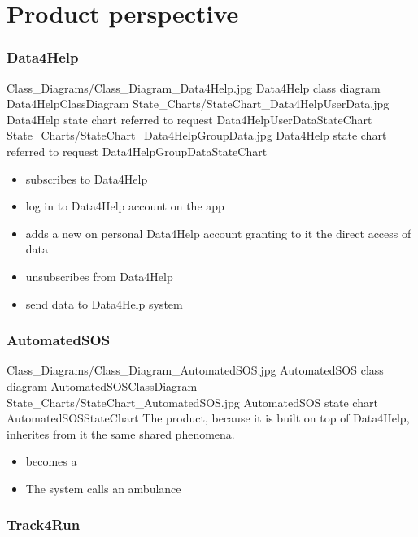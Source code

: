 \documentclass[../../rasd.tex]{subfiles}
\begin{document}
	
	\section{Product perspective}

		\subsubsection{Data4Help}

			\image {13cm} {Class_Diagrams/Class_Diagram_Data4Help.jpg} {Data4Help class diagram} {Data4HelpClassDiagram}
			\image {13cm} {State_Charts/StateChart_Data4HelpUserData.jpg} {Data4Help state chart referred to  request} {Data4HelpUserDataStateChart}
			\image {13cm} {State_Charts/StateChart_Data4HelpGroupData.jpg} {Data4Help state chart referred to  request} {Data4HelpGroupDataStateChart}

			\begin{itemize}
				\item {} subscribes to Data4Help
				\item {} log in to Data4Help account on the app
				\item {} adds a new  on personal Data4Help account granting to it the direct access of data
				\item {} unsubscribes from Data4Help
				\item {} send data to Data4Help system
			\end{itemize}

		\subsubsection{AutomatedSOS}

			\image {13cm} {Class_Diagrams/Class_Diagram_AutomatedSOS.jpg} {AutomatedSOS class diagram} {AutomatedSOSClassDiagram}
			\image {13cm} {State_Charts/StateChart_AutomatedSOS.jpg} {AutomatedSOS state chart} {AutomatedSOSStateChart}
			The product, because it is built on top of Data4Help, inherites from it the same shared phenomena.

			\begin{itemize}
				\item {} becomes a 
				\item The system calls an ambulance
			\end{itemize}

		\subsubsection{Track4Run}
\end{document}
